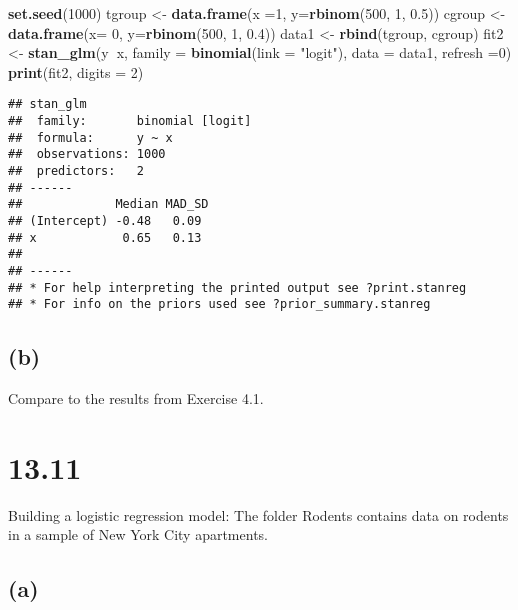 \documentclass[
]{article}
\newenvironment{Shaded}{\begin{snugshade}}{\end{snugshade}}
\newcommand{\DataTypeTok}[1]{\textcolor[rgb]{0.13,0.29,0.53}{#1}}
\newcommand{\DecValTok}[1]{\textcolor[rgb]{0.00,0.00,0.81}{#1}}
\newcommand{\FloatTok}[1]{\textcolor[rgb]{0.00,0.00,0.81}{#1}}
\newcommand{\KeywordTok}[1]{\textcolor[rgb]{0.13,0.29,0.53}{\textbf{#1}}}
\newcommand{\NormalTok}[1]{#1}
\newcommand{\OperatorTok}[1]{\textcolor[rgb]{0.81,0.36,0.00}{\textbf{#1}}}
\newcommand{\StringTok}[1]{\textcolor[rgb]{0.31,0.60,0.02}{#1}}
\begin{document}
\begin{Shaded}
\begin{Highlighting}[]
\KeywordTok{set.seed}\NormalTok{(}\DecValTok{1000}\NormalTok{)}
\NormalTok{tgroup <-}\StringTok{ }\KeywordTok{data.frame}\NormalTok{(}\DataTypeTok{x =}\DecValTok{1}\NormalTok{, }\DataTypeTok{y=}\KeywordTok{rbinom}\NormalTok{(}\DecValTok{500}\NormalTok{, }\DecValTok{1}\NormalTok{, }\FloatTok{0.5}\NormalTok{))}
\NormalTok{cgroup <-}\StringTok{ }\KeywordTok{data.frame}\NormalTok{(}\DataTypeTok{x=} \DecValTok{0}\NormalTok{, }\DataTypeTok{y=}\KeywordTok{rbinom}\NormalTok{(}\DecValTok{500}\NormalTok{, }\DecValTok{1}\NormalTok{, }\FloatTok{0.4}\NormalTok{))}
\NormalTok{data1 <-}\StringTok{ }\KeywordTok{rbind}\NormalTok{(tgroup, cgroup)}
\NormalTok{fit2 <-}\StringTok{ }\KeywordTok{stan_glm}\NormalTok{(y}\OperatorTok{~}\NormalTok{x, }\DataTypeTok{family =} \KeywordTok{binomial}\NormalTok{(}\DataTypeTok{link =} \StringTok{"logit"}\NormalTok{), }\DataTypeTok{data =}\NormalTok{ data1, }\DataTypeTok{refresh =}\DecValTok{0}\NormalTok{)}
\KeywordTok{print}\NormalTok{(fit2, }\DataTypeTok{digits =} \DecValTok{2}\NormalTok{)}
\end{Highlighting}
\end{Shaded}

\begin{verbatim}
## stan_glm
##  family:       binomial [logit]
##  formula:      y ~ x
##  observations: 1000
##  predictors:   2
## ------
##             Median MAD_SD
## (Intercept) -0.48   0.09 
## x            0.65   0.13 
## 
## ------
## * For help interpreting the printed output see ?print.stanreg
## * For info on the priors used see ?prior_summary.stanreg
\end{verbatim}

\hypertarget{b-2}{%
\subsection{(b)}\label{b-2}}

Compare to the results from Exercise 4.1.

\hypertarget{section-4}{%
\section{13.11}\label{section-4}}

Building a logistic regression model: The folder Rodents contains data
on rodents in a sample of New York City apartments.

\hypertarget{a-3}{%
\subsection{(a)}\label{a-3}}
\end{document}
